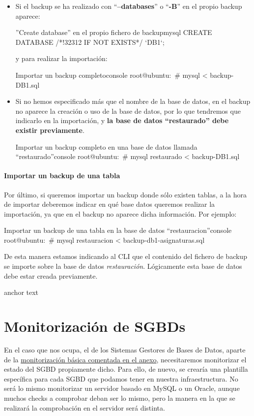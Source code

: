 \begin{itemize}
    \item Si el backup se ha realizado con “\textbf{--databases}” o “\textbf{-B}” en el propio backup aparece:
\begin{mycode}{”Create database” en el propio fichero de backup}{mysql}{}
CREATE DATABASE /*!32312 IF NOT EXISTS*/ `DB1`;
\end{mycode}
    y para realizar la importación:
\begin{mycode}{Importar un backup completo}{console}{}
root@ubuntu:~# mysql < backup-DB1.sql
\end{mycode}

    \item Si no hemos especificado más que el nombre de la base de datos, en el backup no aparece la creación o uso de la base de datos, por lo que tendremos que indicarlo en la importación, y \textbf{la base de datos “restaurado” debe existir previamente}.
\begin{mycode}{Importar un backup completo en una base de datos llamada “restaurado”}{console}{}
root@ubuntu:~# mysql restaurado < backup-DB1.sql
\end{mycode}

\end{itemize}


\subsubsection{Importar un backup de una tabla}
Por último, si queremos importar un backup donde sólo existen tablas, a la hora de importar deberemos indicar en qué base datos queremos realizar la importación, ya que en el backup no aparece dicha información. Por ejemplo:

\begin{mycode}{Importar un backup de una tabla en la base de datos “restauracion”}{console}{}
root@ubuntu:~# mysql restauracion < backup-db1-asignaturas.sql
\end{mycode}

De esta manera estamos indicando al CLI que el contenido del fichero de backup se importe sobre la base de datos \textit{restauración}. Lógicamente esta base de datos debe estar creada previamente.

\hypertarget{monitorizacion_de_sgbds}{anchor text}
\chapter{Monitorización de SGBDs}
En el caso que nos ocupa, el de los Sistemas Gestores de Bases de Datos, aparte de la \hyperlink{sistemas_de_monitorizacion}{monitorización básica comentada en el anexo}, necesitaremos monitorizar el estado del SGBD propiamente dicho. Para ello, de nuevo, se crearía una plantilla específica para cada SGBD que podamos tener en nuestra infraestructura. No será lo mismo monitorizar un servidor basado en MySQL o un Oracle, aunque muchos checks a comprobar deban ser lo mismo, pero la manera en la que se realizará la comprobación en el servidor será distinta.

